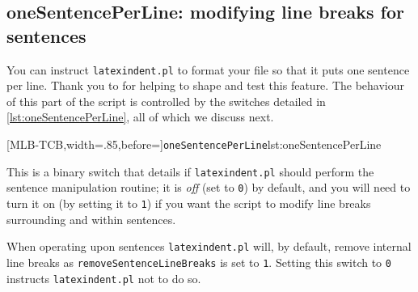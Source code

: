 \subsection{oneSentencePerLine: modifying line breaks for sentences}\label{sec:onesentenceperline}

 You can instruct \texttt{latexindent.pl} to format  your file so that it puts one sentence per line. Thank you to \cite{mlep} for
 helping to shape and test this feature. The behaviour of this part of the script is
 controlled by the switches detailed in \cref{lst:oneSentencePerLine}, all of which we
 discuss next. 
  

 [MLB-TCB,width=.85\linewidth,before=\centering]{\texttt{oneSentencePerLine}}{lst:oneSentencePerLine}

 This is a binary switch that details if \texttt{latexindent.pl} should perform the
 sentence manipulation routine; it is \emph{off} (set to \texttt{0}) by default, and you
 will need to turn it on (by setting it to \texttt{1}) if you want the script to modify
 line breaks surrounding and within sentences.

 When operating upon sentences \texttt{latexindent.pl} will, by default, remove internal
 line breaks as \texttt{removeSentenceLineBreaks} is set to \texttt{1}. Setting this
 switch to \texttt{0} instructs \texttt{latexindent.pl} not to do so.

